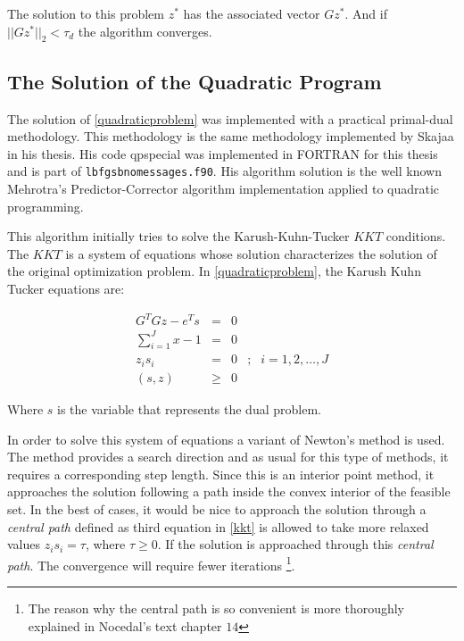 The solution to this problem $z^*$ has the associated vector $Gz^*$. And if $||Gz^*||_2 < \tau_d$ the algorithm converges.

\subsection{The Solution of the Quadratic Program}

The solution of \ref{quadraticproblem} was implemented with a practical primal-dual methodology. This methodology is the same methodology implemented by Skajaa \citep{skajaa} in his thesis. His code \textsf{qpspecial} was implemented in \textsc{FORTRAN} for this thesis and is part of \texttt{lbfgsbnomessages.f90}. His algorithm solution is the well known Mehrotra's Predictor-Corrector algorithm implementation applied to quadratic programming.

This algorithm initially tries to solve the Karush-Kuhn-Tucker $KKT$ conditions. The $KKT$ is a system of equations whose solution characterizes the solution of the original optimization problem. In \ref{quadraticproblem}, the Karush Kuhn Tucker equations are:

\begin{equation} \label{kkt}
  \begin{aligned}
    G^TGz - e^Ts
    & = & 0 & \\
    \sum_{i = 1}^J x - 1
    & = & 0 & \\
    z_is_i & = & 0 &; &i = 1,2, \dots, J\\
    (s, z) & \geq & 0 &
  \end{aligned}
\end{equation}

Where $s$ is the variable that represents the dual problem.

In order to solve this system of equations a variant of Newton's method is used. The method provides a search direction and as usual for this type of methods, it  requires a corresponding step length. Since this is an interior point method, it approaches the solution following a path inside the convex interior of the feasible set.  In the best of cases, it would be nice to approach the solution through a \emph{central path} defined as third equation in \ref{kkt} is allowed to take more relaxed values $z_is_i = \tau$, where $\tau \geq 0$. If the solution is approached through this \emph{central path}. The convergence will require fewer iterations \footnote{The reason why the central path is so convenient is more thoroughly explained in Nocedal's text chapter $14$\citep{nocedal}}.

